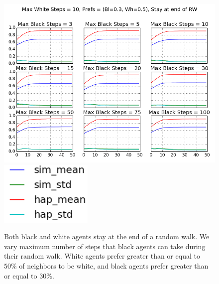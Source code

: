 \documentclass[11pt,twoside]{amsart}
\theoremstyle{theorem}
\theoremstyle{definition}
\theoremstyle{remark}
\begin{document}
    \begin{figure}[p]
        \center
        \includegraphics[scale=0.60]{stay_at_end_rw_change_black_max.png}
        \includegraphics[scale=0.40]{no_stay_at_end_legend.png}
        \caption{Both black and white agents stay at the end of a random walk. We vary maximum number of steps that black agents can take during their random walk. White agents prefer greater than or equal to $50\%$ of neighbors to be white, and black agents prefer greater than or equal to $30\%$. }
        \label{fig:stay_black}
    \end{figure}
\end{document}
